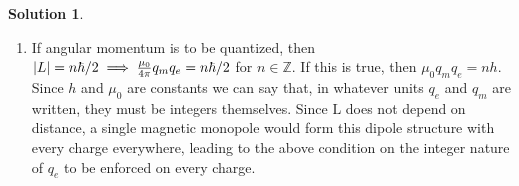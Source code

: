 \documentclass[10pt]{article}
\theoremstyle{definition}
\newtheorem{soln}{Solution}
\newcommand{\uv}[1]{\hat{\bv{{#1}}}}
\newcommand{\bv}[1]{\bm{\mathrm{#1}}}
\begin{document}
\begin{soln}
\begin{enumerate}[label=(\alph*)]
\begin{align*}
                      & =-\frac{\mu_0}{(4\pi)^2}q_mq_e \frac{R}{r}\frac{1}{\abs{\bv{r}-\bv{R}}^3}\left[\uv{R}-(\uv{r}\cdot\uv{R})\uv{r}\right].
          \end{align*}
          So integrating the above expression using the given formula we obtain the angular momentum,
          $$\bv{L}=-\frac{\mu_0}{4\pi}q_mq_e\uv{R}.$$
          To answer the sub questions, evidently the angular momentum points from the electric to the magnetic charge,
          the angular momentum has no dependence on the magnitude of $\bv{R}$, meaning these charges can be as far away as you can get them
          and their dipole has the same angular momentum, no it is not intuitive that these static charges can create angular momentum, and it feels
          like something similar to intrinsic angular momentum due to spin.
    \item If angular momentum is to be quantized, then $\abs{L}=n\hbar/2\implies \frac{\mu_0}{4\pi}q_mq_e=n\hbar/2$ for $n\in\mathbb{Z}$.
          If this is true, then $\mu_0q_mq_e=nh$. Since $h$ and $\mu_0$ are constants we can say that, in whatever units $q_e$ and $q_m$ are written,
          they must be integers themselves. Since $\bv{L}$ does not depend on distance, a single magnetic monopole would form this dipole structure with
          every charge everywhere, leading to the above condition on the integer nature of $q_e$ to be enforced on every charge.
  \end{enumerate}
\end{soln}
\end{document}
